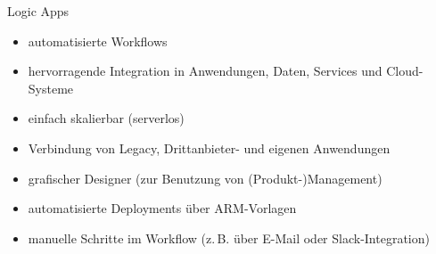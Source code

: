 \begin{flashcard}[]{Logic Apps}
  \begin{itemize}
    \item automatisierte Workflows
    \item hervorragende Integration in Anwendungen, Daten, Services und Cloud-Systeme
    \item einfach skalierbar (serverlos)
    \item Verbindung von Legacy, Drittanbieter- und eigenen Anwendungen
    \item grafischer Designer (zur Benutzung von (Produkt-)Management)
    \item automatisierte Deployments über ARM-Vorlagen
    \item manuelle Schritte im Workflow (z.\,B. über E-Mail oder Slack-Integration)
  \end{itemize}
\end{flashcard}
